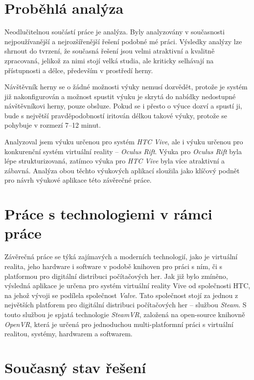 \documentclass[12pt, a4paper]{article}
\begin{document}
\newpage

\section{Proběhlá analýza}

Neodlučitelnou součástí práce je analýza. Byly analyzovány v současnosti nejpoužívanější a nejrozšířenější řešení podobné mé práci. Výsledky analýzy lze shrnout do tvrzení, že současná řešení jsou velmi atraktivní a kvalitně zpracovaná, jelikož za nimi stojí velká studia, ale kriticky selhávají na přístupnosti a délce, především v prostředí herny.

Návštěvník herny se o žádné možnosti výuky nemusí dozvědět, protože je systém již nakonfigurován a možnost spustit výuku je skrytá do nabídky nedostupné návštěvníkovi herny, pouze obsluze. Pokud se i přesto o výuce dozví a spustí ji, bude s největší pravděpodobností iritován délkou takové výuky, protože se pohybuje v rozmezí 7--12 minut.

Analyzoval jsem výuku určenou pro systém \textit{HTC Vive}, ale i výuku určenou pro konkurenční systém virtuální reality -- \textit{Oculus Rift}. Výuka pro \textit{Oculus Rift} byla lépe strukturizovaná, zatímco výuka pro \textit{HTC Vive} byla více atraktivní a zábavná. Analýza obou těchto výukových aplikací sloužila jako klíčový podnět pro návrh výukové aplikace této závěrečné práce.

\section{Práce s technologiemi v rámci práce}

Závěrečná práce se týká zajímavých a moderních technologií, jako je virtuální realita, jeho hardware i software v podobě knihoven pro práci s ním, či s platformou pro digitální distribuci počítačových her. Jak již bylo zmíněno, výsledná aplikace je určena pro systém virtuální reality Vive od společnosti HTC, na jehož vývoji se podílela společnost \textit{Valve}. Tato společnost stojí za jednou z největších platforem pro digitální distribuci počítačových her -- službou \textit{Steam}. S touto službou je spjatá technologie \textit{SteamVR}, založená na open-source knihovně \textit{OpenVR}, která je určená pro jednoduchou multi-platformní práci s virtuální realitou, systémy, hardwarem a softwarem.

\section{Současný stav řešení}
\end{document}
